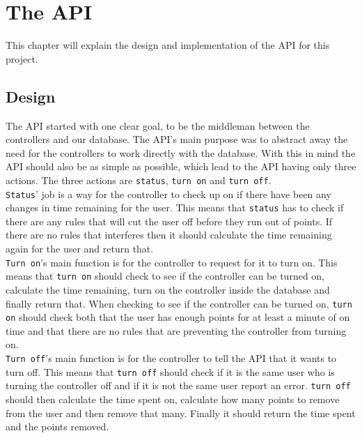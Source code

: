 \chapter{The API}
This chapter will explain the design and implementation of the API for this project.
\section{Design}
The API started with one clear goal, to be the middleman between the controllers and our database. The API's main purpose was to abstract away the need for the controllers to work directly with the database. With this in mind the API should also be as simple as possible, which lead to the API having only three actions. The three actions are \texttt{status}, \texttt{turn on} and \texttt{turn off}. \\
\texttt{Status}' job is a way for the controller to check up on if there have been any changes in time remaining for the user. This means that \texttt{status} has to check if there are any rules that will cut the user off before they run out of points. If there are no rules that interferes then it should calculate the time remaining again for the user and return that. \\
\texttt{Turn on}'s main function is for the controller to request for it to turn on. This means that \texttt{turn on} should check to see if the controller can be turned on, calculate the time remaining, turn on the controller inside the database and finally return that. When checking to see if the controller can be turned on, \texttt{turn on} should check both that the user has enough points for at least a minute of on time and that there are no rules that are preventing the controller from turning on. \\
\texttt{Turn off}'s main function is for the controller to tell the API that it wants to turn off. This means that \texttt{turn off} should check if it is the same user who is turning the controller off and if it is not the same user report an error. \texttt{turn off} should then calculate the time spent on, calculate how many points to remove from the user and then remove that many. Finally it should return the time spent and the points removed.


